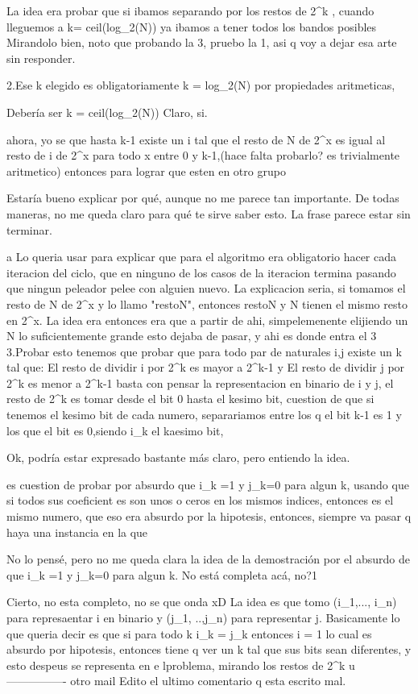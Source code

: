La idea era probar que si ibamos separando por los restos de 2^k , cuando lleguemos a k= ceil(log_2(N)) ya ibamos a tener todos los bandos posibles
Mirandolo bien, noto que probando la 3, pruebo la 1, asi q voy a dejar esa arte sin responder.

2.Ese k elegido es obligatoriamente k = log_2(N) por propiedades aritmeticas,

Debería ser k = ceil(log_2(N))
Claro, si.
 

    ahora, yo se que hasta k-1 existe un i tal que el resto de N de 2^x es igual al resto de i de 2^x para todo x entre 0 y k-1,(hace falta probarlo? es trivialmente aritmetico) entonces para lograr que esten en otro grupo


Estaría bueno explicar por qué, aunque no me parece tan importante. De todas maneras, no me queda claro para qué te sirve saber esto. La frase parece estar sin terminar.

 
a Lo queria usar para explicar que para el algoritmo era obligatorio hacer cada iteracion del ciclo, que en ninguno de los casos de la iteracion termina pasando que ningun peleador pelee con alguien nuevo.
La explicacion seria, si tomamos el resto de N de 2^x y lo llamo "restoN", entonces restoN y N tienen el mismo resto en 2^x.
La idea era entonces era que a partir de ahi, simpelemenente elijiendo un N lo suficientemente grande esto dejaba de pasar, y ahi es donde entra el 3
3.Probar esto tenemos que probar que para todo par de naturales  i,j existe un k tal que:
    El resto de dividir i por 2^k es mayor a 2^{k-1} y El resto de dividir j por 2^k es menor a 2^{k-1} 
basta con pensar la representacion en binario de i y j, el resto de 2^k es tomar desde el bit 0 hasta el kesimo bit, cuestion de que si tenemos el kesimo bit de cada numero, separariamos entre los q el bit k-1 es 1 y los que el bit es 0,siendo i_k el kaesimo bit,

Ok, podría estar expresado bastante más claro, pero entiendo la idea.
 

    es cuestion de probar por absurdo que  i_k =1 y j_k=0 para algun k, usando que si todos sus coeficient es son unos o ceros en los mismos indices, entonces es el mismo numero, que eso era absurdo por la hipotesis, entonces, siempre va pasar q haya una instancia en la que


No lo pensé, pero no me queda clara la idea de la demostración por el absurdo de que i_k =1 y j_k=0 para algun k. No está completa acá, no?1

Cierto, no esta completo, no se que onda xD
La idea es que tomo (i_1,..., i_n) para represaentar i en binario y (j_1, ..,j_n) para representar j.
Basicamente lo que queria decir es que si para todo k i_k = j_k entonces i = 1 lo cual es absurdo por hipotesis, entonces tiene q ver un k tal que sus bits sean diferentes, y esto despeus se representa en e lproblema, mirando los restos de 2^k
u----------------
otro mail
Edito el ultimo comentario q esta escrito mal.

